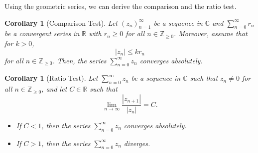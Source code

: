 \documentclass[a4paper, openany]{memoir}
\theoremstyle{definition}
\theoremstyle{plain}
\newtheorem{corollary}[definition]{Corollary}
\begin{document}
Using the geometric series, we can derive the comparison and the ratio test. 
\begin{corollary}[Comparison Test]
Let $(z_n)_{n=1}^{\infty}$ be a sequence in $\mathbb{C}$ and $\sum_{n=0}^\infty r_n$ be a convergent series in $\mathbb{R}$ with $r_n \geq 0$ for all $n \in \mathbb{Z}_{\geqslant 0}$. Moreover, assume that for $k > 0$,
\[|z_n| \leqslant kr_n\]
for all $n \in \mathbb{Z}_{\geqslant 0}$. Then, the series $\sum_{n=0}^{\infty} z_n$ converges absolutely.
\end{corollary}
\begin{corollary}[Ratio Test]
Let $\sum_{n=0}^{\infty} z_n$ be a sequence in $\mathbb{C}$ such that $z_n \neq 0$ for all $n \in \mathbb{Z}_{\geq 0}$, and let $C \in \mathbb{R}$ such that
\[\lim_{n \to \infty} \frac{|z_{n+1}|}{|z_n|} = C.\]
\begin{itemize}
    \item If $C < 1$, then the series $\sum_{n=0}^{\infty} z_n$ converges absolutely.
    \item If $C > 1$, then the series $\sum_{n=0}^{\infty} z_n$ diverges.
\end{itemize}
\end{corollary}
    
\end{document}

